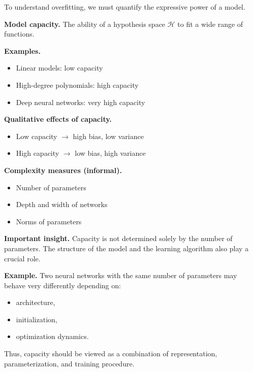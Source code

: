 To understand overfitting, we must quantify the expressive power of a model.

\medskip

\noindent
\textbf{Model capacity.}  
The ability of a hypothesis space $\mathcal{H}$ to fit a wide range of functions.

\medskip

\noindent
\textbf{Examples.}
\begin{itemize}
    \item Linear models: low capacity
    \item High-degree polynomials: high capacity
    \item Deep neural networks: very high capacity
\end{itemize}

\medskip

\noindent
\textbf{Qualitative effects of capacity.}
\begin{itemize}
    \item Low capacity $\rightarrow$ high bias, low variance
    \item High capacity $\rightarrow$ low bias, high variance
\end{itemize}

\medskip

\noindent
\textbf{Complexity measures (informal).}
\begin{itemize}
    \item Number of parameters
    \item Depth and width of networks
    \item Norms of parameters
\end{itemize}

\medskip

\noindent
\textbf{Important insight.}  
Capacity is not determined solely by the number of parameters. The structure of the model and the learning algorithm also play a crucial role.

\medskip

\noindent
\textbf{Example.}  
Two neural networks with the same number of parameters may behave very differently depending on:
\begin{itemize}
    \item architecture,
    \item initialization,
    \item optimization dynamics.
\end{itemize}

\medskip

\noindent
Thus, capacity should be viewed as a combination of representation, parameterization, and training procedure.

